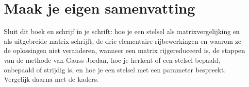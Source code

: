 \begin{oefeningen}






\end{oefeningen}


\ifzelfstudie
\section*{Maak je eigen samenvatting}
Sluit dit boek en schrijf in je schrift: hoe je een stelsel als matrixvergelijking en als uitgebreide matrix schrijft, de drie elementaire rijbewerkingen en waarom ze de oplossingen niet veranderen, wanneer een matrix rijgereduceerd is, de stappen van de methode van Gauss-Jordan, hoe je herkent of een stelsel bepaald, onbepaald of strijdig is, en hoe je een stelsel met een parameter bespreekt. Vergelijk daarna met de kaders.
\fi
